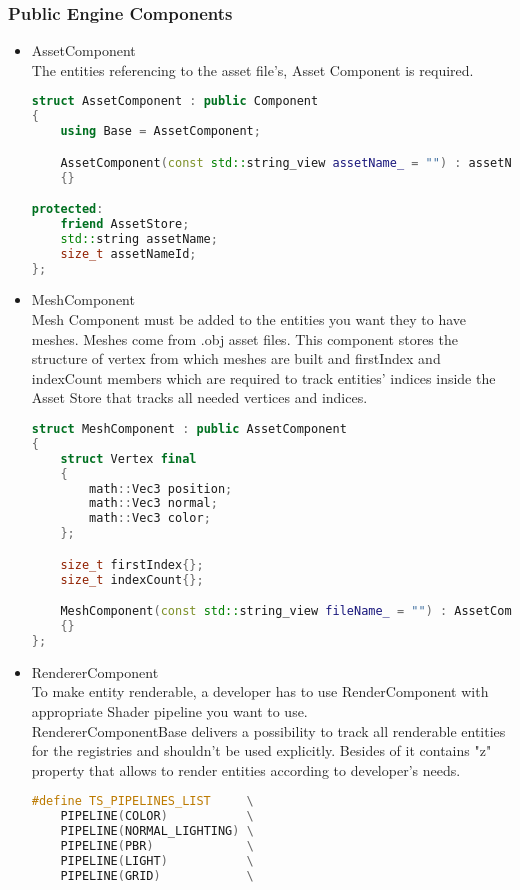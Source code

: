 \subsubsection{Public Engine Components}
\begin{itemize}
    \item AssetComponent\\
    The entities referencing to the asset file's, Asset Component is required.
\begin{lstlisting}[language=c++, caption= Asset Component struct(./engine/include/tsengine/ecs/components/asset\_component.h)]
struct AssetComponent : public Component
{
    using Base = AssetComponent;

    AssetComponent(const std::string_view assetName_ = "") : assetName{assetName_}, assetNameId{std::hash<std::string_view>{}(assetName_)}
    {}

protected:
    friend AssetStore;
    std::string assetName;
    size_t assetNameId;
};
\end{lstlisting}
    \item MeshComponent\\
    Mesh Component must be added to the entities you want they to have meshes.
    Meshes come from .obj asset files.
    This component stores the structure of vertex from which meshes are built and firstIndex and indexCount members which are required to track entities' indices inside the Asset Store that tracks all needed vertices and indices. 
\begin{lstlisting}[language=c++, caption= Mesh Component struct (./engine/include/tsengine/ecs/components/mesh\_component.h)]
struct MeshComponent : public AssetComponent
{
    struct Vertex final
    {
        math::Vec3 position;
        math::Vec3 normal;
        math::Vec3 color;
    };

    size_t firstIndex{};
    size_t indexCount{};

    MeshComponent(const std::string_view fileName_ = "") : AssetComponent{fileName_}
    {}
};
\end{lstlisting}
    \item RendererComponent\\
    \label{sec:render_component}
    To make entity renderable, a developer has to use RenderComponent with appropriate Shader pipeline you want to use.\\
    RendererComponentBase delivers a possibility to track all renderable entities for the registries and shouldn't be used explicitly. Besides of it contains "z" property that allows to render entities according to developer's needs. 
\begin{lstlisting}[language=c++, caption=Renderer Component struct (./engine/include/tsengine/ecs/components/renderer\_component.h)]
#define TS_PIPELINES_LIST     \
    PIPELINE(COLOR)           \
    PIPELINE(NORMAL_LIGHTING) \
    PIPELINE(PBR)             \
    PIPELINE(LIGHT)           \
    PIPELINE(GRID)            \



\end{lstlisting}
\end{itemize}
